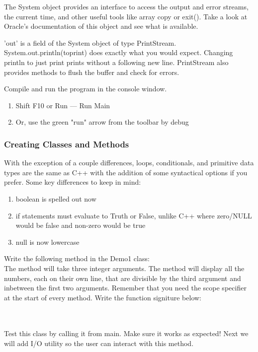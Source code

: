 \documentclass[../../main.tex]{subfiles}
\begin{document}
\begin{steps}
   \item The System object provides an interface to access the output and error streams, the current time, and other useful tools like array copy or exit(). Take a look at Oracle's documentation of this object and see what is available.

   \item 'out' is a field of the System object of type PrintStream. System.out.println(to\textunderscore print) does exactly what you would expect. Changing println to just print prints without a following new line. PrintStream also provides methods to flush the buffer and check for errors.
   \item Compile and run the program in the console window.
   \begin{enumerate}[label=\Alph*.]
   \item Shift F10 or Run --- Run Main
   \item Or, use the green "run" arrow from the toolbar by debug
   \end{enumerate}
\end{steps}
\subsubsection{Creating Classes and Methods}
   \begin{steps}
      \item With the exception of a couple differences, loops, conditionals, and primitive
         data types are the same as C++ with the addition of some syntactical options if
         you prefer. Some key differences to keep in mind:
   \begin{enumerate}[label=\Alph*.]
      \item boolean is spelled out now
      \item if statements must evaluate to Truth or False, unlike C++ where zero/NULL
         would be false and non-zero would be true
      \item null is now lowercase
   \end{enumerate}
   \item Write the following method in the Demo1 class: \\
      The method will take three integer arguments. The method will display all the numbers,
      each on their own line, that are divisible by the third argument and inbetween the first
      two arguments. Remember that you need the scope specifier at the start of every method.
      Write the function signiture below: \\
      \vspace{1cm}\\
      \underline{\hspace{15cm}}\\
      \item Test this class by calling it from main. Make sure it works as expected!
         Next we will add I/O utility so the user can interact with this method.
   \end{steps}
\end{document}
